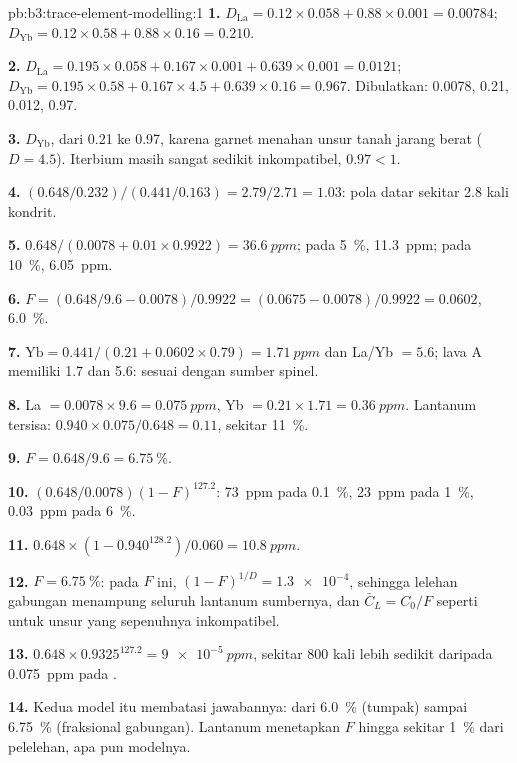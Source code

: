 \begin{solution}{pb:b3:trace-element-modelling:1}
\textbf{1.} $D_{\mathrm{La}} = 0.12\times0.058 + 0.88\times0.001 = 0.00784$;
$D_{\mathrm{Yb}} = 0.12\times0.58 + 0.88\times0.16 = 0.210$.

\textbf{2.} $D_{\mathrm{La}} = 0.195\times0.058 + 0.167\times0.001 +
0.639\times0.001 = 0.0121$; $D_{\mathrm{Yb}} = 0.195\times0.58 +
0.167\times4.5 + 0.639\times0.16 = 0.967$. Dibulatkan: 0.0078, 0.21, 0.012, 0.97.

\textbf{3.} $D_{\mathrm{Yb}}$, dari 0.21 ke 0.97, karena garnet menahan
unsur tanah jarang berat ($D = 4.5$). Iterbium masih sangat sedikit inkompatibel,
$0.97 < 1$.

\textbf{4.} $(0.648/0.232)/(0.441/0.163) = 2.79/2.71 = 1.03$: pola datar
sekitar 2.8 kali kondrit.

\textbf{5.} $0.648/(0.0078 + 0.01\times0.9922) = \qty{36.6}{ppm}$; pada
\qty{5}{\percent}, \qty{11.3}{ppm}; pada \qty{10}{\percent}, \qty{6.05}{ppm}.

\textbf{6.} $F = (0.648/9.6 - 0.0078)/0.9922 = (0.0675 - 0.0078)/0.9922 =
0.0602$, \qty{6.0}{\percent}.

\textbf{7.} $\mathrm{Yb} = 0.441/(0.21 + 0.0602\times0.79) = \qty{1.71}{ppm}$
dan La/Yb $= 5.6$; lava A memiliki 1.7 dan 5.6: sesuai dengan sumber spinel.

\textbf{8.} La $= 0.0078\times9.6 = \qty{0.075}{ppm}$, Yb $= 0.21\times1.71 =
\qty{0.36}{ppm}$. Lantanum tersisa: $0.940\times0.075/0.648 = 0.11$, sekitar
\qty{11}{\percent}.

\textbf{9.} $F = 0.648/9.6 = \qty{6.75}{\percent}$.

\textbf{10.} $(0.648/0.0078)(1 - F)^{127.2}$: \qty{73}{ppm} pada
\qty{0.1}{\percent}, \qty{23}{ppm} pada \qty{1}{\percent}, \qty{0.03}{ppm} pada
\qty{6}{\percent}.

\textbf{11.} $0.648\times(1 - 0.940^{128.2})/0.060 = \qty{10.8}{ppm}$.

\textbf{12.} $F = \qty{6.75}{\percent}$: pada $F$ ini, $(1 - F)^{1/D} =
\num{1.3e-4}$, sehingga lelehan gabungan menampung seluruh lantanum sumbernya, dan
$\bar C_L = C_0/F$ seperti untuk unsur yang sepenuhnya inkompatibel.

\textbf{13.} $0.648\times0.9325^{127.2} = \qty{9e-5}{ppm}$, sekitar 800 kali
lebih sedikit daripada \qty{0.075}{ppm} pada .

\textbf{14.} Kedua model itu membatasi jawabannya: dari \qty{6.0}{\percent} (tumpak)
sampai \qty{6.75}{\percent} (fraksional gabungan). Lantanum menetapkan $F$ hingga
sekitar \qty{1}{\percent} dari pelelehan, apa pun modelnya.


\end{solution}
